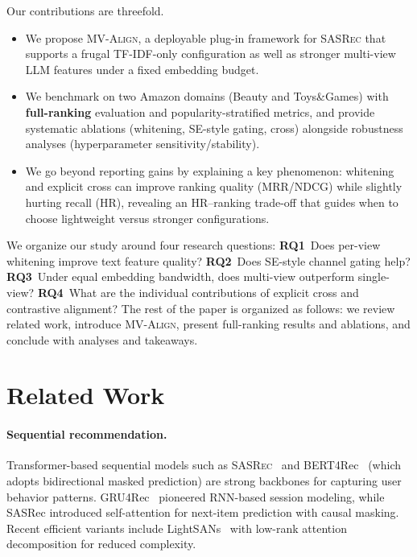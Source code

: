 \documentclass[sigconf,natbib=true,anonymous]{acmart}
\newcommand{\model}{\textsc{MV-Align}\xspace}
\newcommand{\base}{\textsc{SASRec}\xspace}
\newcommand{\tfidf}{\textsc{TF-IDF}\xspace}
\newcommand{\llm}{\textsc{LLM}\xspace}
\begin{document}
Our contributions are threefold.
\begin{itemize}[leftmargin=*,itemsep=1pt]
  \item We propose \model, a deployable plug-in framework for
    \base that supports a frugal \tfidf-only configuration as
    well as stronger multi-view \llm features under a fixed
    embedding budget.
  \item We benchmark on two Amazon domains (Beauty and
    Toys\&Games) with \textbf{full-ranking} evaluation and
    popularity-stratified metrics, and provide systematic
    ablations (whitening, SE-style gating, cross) alongside robustness
    analyses (hyperparameter sensitivity/stability).
  \item We go beyond reporting gains by explaining a key
    phenomenon: whitening and explicit cross can improve
    ranking quality (MRR/NDCG) while slightly hurting recall
    (HR), revealing an HR--ranking trade-off that guides when
    to choose lightweight versus stronger configurations.
\end{itemize}
We organize our study around four research questions:
\textbf{RQ1}~Does per-view whitening improve text feature quality?
\textbf{RQ2}~Does SE-style channel gating help?
\textbf{RQ3}~Under equal embedding bandwidth, does multi-view outperform single-view?
\textbf{RQ4}~What are the individual contributions of explicit cross and contrastive alignment?
The rest of the paper is organized as follows: we review
related work, introduce \model, present full-ranking results
and ablations, and conclude with analyses and takeaways.


\section{Related Work}
\paragraph{Sequential recommendation.}
Transformer-based sequential models such as
\base~\cite{kang2018sasrec} and BERT4Rec~\cite{sun2019bert4rec}
(which adopts bidirectional masked prediction) are strong backbones for
capturing user behavior patterns.
GRU4Rec~\cite{hidasi2016gru4rec} pioneered RNN-based session
modeling, while SASRec introduced self-attention for next-item
prediction with causal masking. Recent efficient variants
include LightSANs~\cite{fan2021lightsans} with low-rank
attention decomposition for reduced complexity.
\end{document}
